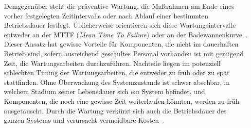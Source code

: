 Demgegenüber steht die präventive Wartung, die Maßnahmen am Ende eines vorher festgelegten Zeitintervalls oder nach Ablauf einer
bestimmten Betriebsdauer festlegt. Üblicherweise orientieren sich diese Wartungsintervalle entweder an der MTTF (\textit{Mean Time
To Failure}) oder an der Badewannenkurve~\cite{Andrews2002}. Dieser Ansatz hat gewisse Vorteile für Komponenten, die nicht im
dauerhaften Betrieb sind, sofern ausreichend geschultes Personal vorhanden ist mit genügend Zeit, die Wartungsarbeiten durchzuführen.
Nachteile liegen im potenziell schlechten Timing der Wartungsarbeiten, die entweder zu früh oder zu spät stattfinden. Ohne Überwachung
des Systemzustands ist schwer absehbar, in welchem Stadium seiner Lebensdauer sich ein System befindet, und Komponenten, die noch
eine gewisse Zeit weiterlaufen könnten, werden zu früh ausgetauscht. Durch die Wartung verkürzt sich auch die Betriebsdauer des ganzen
Systems und verursacht vermeidbare Kosten~\cite{Scheffer2004}.
